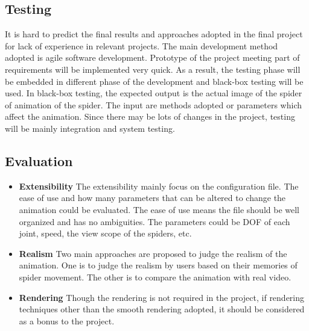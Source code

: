 \subsection{Testing}
It is hard to predict the final results and approaches adopted in the final project for lack of experience in relevant projects. The main development method adopted is agile software development. Prototype of the project meeting part of requirements will be implemented very quick. As a result, the testing phase will be embedded in different phase of the development and black-box testing will be used. 
In black-box testing, the expected output is the actual image of the spider of animation of the spider. The input are methods adopted or parameters which affect the animation. Since there may be lots of changes in the project, testing will be mainly integration and system testing. 
\subsection{Evaluation}
\begin{itemize}
  \item \textbf{Extensibility}  
   The extensibility mainly focus on the configuration file. The ease of use and how many parameters that can be altered to change the animation could be evaluated. The ease of use means the file should be well organized and has no ambiguities. The parameters could be DOF of each joint, speed, the view scope of the spiders, etc.
  \item \textbf{Realism} 
Two main approaches are proposed to judge the realism of the animation. One is to judge the realism by users based on their memories of spider movement. The other is to compare the animation with real video.
\item \textbf{Rendering}
Though the rendering is not required in the project, if rendering techniques other than the smooth rendering adopted, it should be considered as a bonus to the project. 
\end{itemize}
